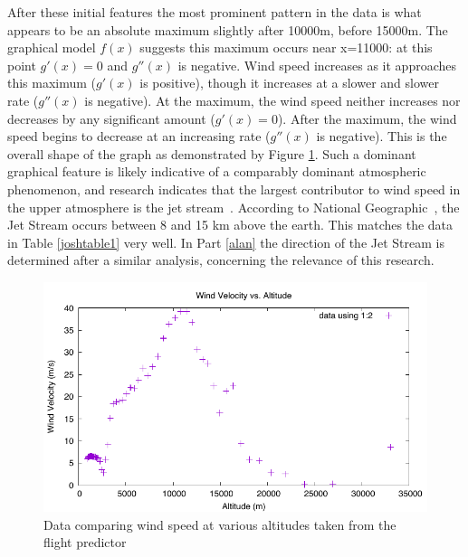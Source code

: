 \documentclass{article}
\begin{document}
After these initial features the most prominent pattern in the data is what appears to be an absolute maximum slightly after 10000\si{m}, before 15000\si{m}.  The graphical model $f(x)$ suggests this maximum occurs near x=11000: at this point $g'(x) = 0$ and $g''(x)$ is negative.  Wind speed increases as it approaches this maximum ($g'(x)$ is positive), though it increases at a slower and slower rate ($g''(x)$ is negative). At the maximum, the wind speed neither increases nor decreases by any significant amount ($g'(x)=0$).  After the maximum, the wind speed begins to decrease at an increasing rate ($g''(x)$ is negative).  This is the overall shape of the graph as demonstrated by Figure \ref{josh1}.  Such a dominant graphical feature is likely indicative of a comparably dominant atmospheric phenomenon, and research indicates that the largest contributor to wind speed in the upper atmosphere is the jet stream~\cite{National-Geographic}.  According to National Geographic~\cite{National-Geographic}, the Jet Stream occurs between 8 and 15 \si{km} above the earth.  This matches the data in Table \ref{joshtable1} very well.  In Part \ref{alan} the direction of the Jet Stream is determined after a similar analysis, concerning the relevance of this research.


\begin{figure}[p]
\centering
\includegraphics{josh-data/figure1.pdf}
\caption{Data comparing wind speed at various altitudes taken from the flight predictor}
\label{josh1}
\end{figure}
\end{document}
